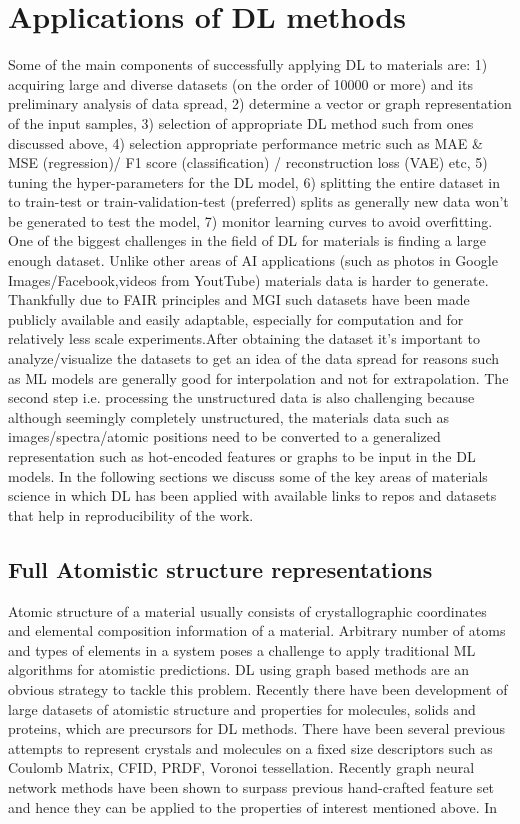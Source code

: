 \documentclass[pdflatex,sn-mathphys]{sn-jnl}%
\theoremstyle{thmstyleone}%
\theoremstyle{thmstyletwo}%
\theoremstyle{thmstylethree}%
\begin{document}
\section{Applications of DL methods}\label{sec:applications}
Some of the main components of successfully applying DL to materials are: 
1) acquiring large and diverse datasets (on the order of 10000 or more) and its preliminary analysis of data spread, 2) determine a vector or graph representation of the input samples, 3) selection of appropriate DL method such from ones discussed above, 4) selection appropriate performance metric such as MAE \& MSE  (regression)/ F1 score (classification) / reconstruction loss (VAE) etc, 5) tuning the hyper-parameters for the DL model, 6) splitting the entire dataset in to train-test or train-validation-test (preferred) splits as generally new data won't be generated to test the model, 7) monitor learning curves to avoid overfitting. One of the biggest challenges in the field of DL for materials is finding a large enough dataset. Unlike other areas of AI applications (such as photos in Google Images/Facebook,videos from YoutTube) materials data is harder to generate. Thankfully due to FAIR principles and MGI such datasets have been made publicly available and easily adaptable, especially for computation and for relatively less scale experiments.After obtaining the dataset it's important to analyze/visualize the datasets to get an idea of the data spread for reasons such as ML models are generally good for interpolation and not for extrapolation. The second step i.e. processing the unstructured data is also challenging because although seemingly completely unstructured, the materials data such as images/spectra/atomic positions need to be converted to a generalized representation such as hot-encoded features or graphs to be input in the DL models. In the following sections we discuss some of the key areas of materials science in which DL has been applied with available links to repos and datasets that help in reproducibility of the work.



\subsection{Full Atomistic structure representations}\label{sec:atomistic}
Atomic structure of a material usually consists of crystallographic coordinates and elemental composition information of a material. Arbitrary number of atoms and types of elements in a system poses a challenge to apply traditional ML algorithms for atomistic predictions. DL using graph based methods are an obvious strategy to tackle this problem. Recently there have been development of large datasets of atomistic structure and properties for molecules, solids and proteins, which are precursors for DL methods.
There have been several previous attempts to represent crystals and molecules on a fixed size descriptors such as Coulomb Matrix, CFID, PRDF, Voronoi tessellation. Recently graph neural network methods have been shown to surpass previous hand-crafted feature set and hence they can be applied to the properties of interest mentioned above. In
\end{document}
